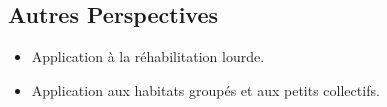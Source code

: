 \documentclass[xcolor=x11names, compress, 11pt]{beamer}
\begin{document}
\subsection{Autres Perspectives}
\begin{frame}[noframenumbering, c]
    \vfill
    \begin{itemize}
        \item Application à la réhabilitation lourde.
    \vfill
        \item<2-> Application aux habitats groupés et aux petits collectifs.
    \end{itemize}
    \vfill
\end{frame}




\end{document}
